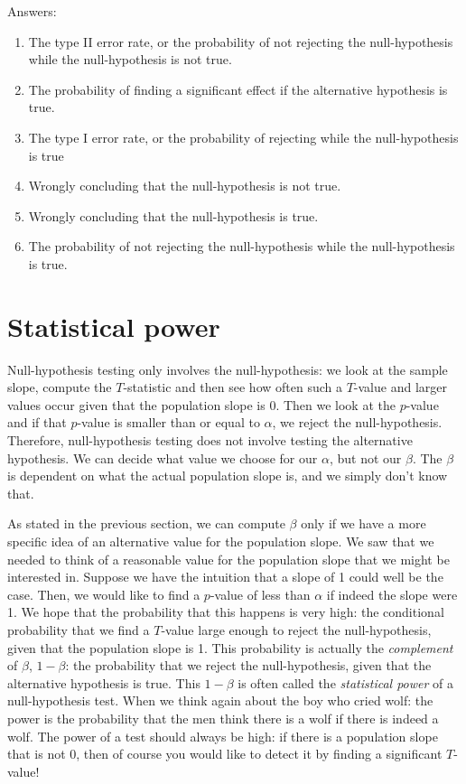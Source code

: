 \documentclass[]{book}\usepackage[]{graphicx}\usepackage[]{color}
\begin{document}
Answers:

\begin{enumerate}

\item The type II error rate, or the probability of not rejecting the null-hypothesis while the null-hypothesis is not true.

\item The probability of finding a significant effect if the alternative hypothesis is true.

\item The type I error rate, or the probability of rejecting while the null-hypothesis is true

\item Wrongly concluding that the null-hypothesis is not true.

\item Wrongly concluding that the null-hypothesis is true.

\item The probability of not rejecting the null-hypothesis while the null-hypothesis is true.


\end{enumerate}


\section{Statistical power}

Null-hypothesis testing only involves the null-hypothesis: we look at the sample slope, compute the $T$-statistic and then see how often such a $T$-value and larger values occur given that the population slope is 0. Then we look at the $p$-value and if that $p$-value is smaller than or equal to $\alpha$, we reject the null-hypothesis. Therefore, null-hypothesis testing does not involve testing the alternative hypothesis. We can decide what value we choose for our $\alpha$, but not our $\beta$. The $\beta$ is dependent on what the actual population slope is, and we simply don't know that.

As stated in the previous section, we can compute $\beta$ only if we have a more specific idea of an alternative value for the population slope. We saw that we needed to think of a reasonable value for the population slope that we might be interested in. Suppose we have the intuition that a slope of 1 could well be the case. Then, we would like to find a $p$-value of less than $\alpha$ if indeed the slope were 1. We hope that the probability that this happens is very high: the conditional probability that we find a $T$-value large enough to reject the null-hypothesis, given that the population slope is 1. This probability is actually the \textit{complement} of $\beta$, $1-\beta$: the probability that we reject the null-hypothesis, given that the alternative hypothesis is true. This $1-\beta$ is often called the \textit{statistical power} of a null-hypothesis test. When we think again about the boy who cried wolf: the power is the probability that the men think there is a wolf if there is indeed a wolf. The power of a test should always be high: if there is a population slope that is not 0, then of course you would like to detect it by finding a significant $T$-value!
\end{document}
